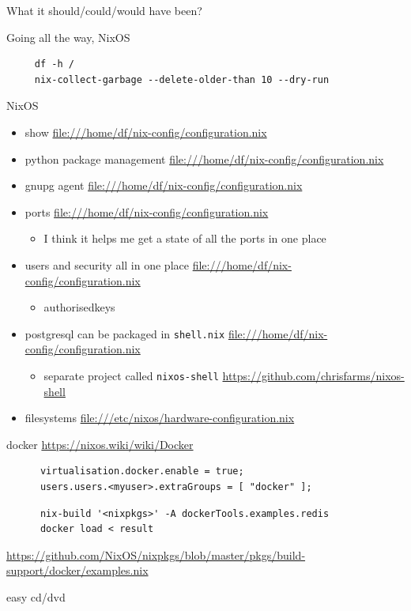 \documentclass[presentation]{beamer}
\begin{document}
\begin{frame}[label={sec:org72632d2},fragile]{What it should/could/would have been?}
\begin{block}{Going all the way, NixOS}
\begin{itemize}
\end{itemize}
\begin{verbatim}
     df -h /
     nix-collect-garbage --delete-older-than 10 --dry-run
\end{verbatim}
\begin{block}{NixOS}
\begin{itemize}
\item show \url{file:///home/df/nix-config/configuration.nix}
\item python package management \url{file:///home/df/nix-config/configuration.nix}
\item gnupg agent \url{file:///home/df/nix-config/configuration.nix}
\item ports \url{file:///home/df/nix-config/configuration.nix}
\begin{itemize}
\item I think it helps me get a state of all the ports in one place
\end{itemize}
\item users and security all in one place
\url{file:///home/df/nix-config/configuration.nix}
\begin{itemize}
\item authorisedkeys
\end{itemize}
\item postgresql can be packaged in \texttt{shell.nix}
\url{file:///home/df/nix-config/configuration.nix}
\begin{itemize}
\item separate project called \texttt{nixos-shell}
\url{https://github.com/chrisfarms/nixos-shell}
\end{itemize}
\item filesystems \url{file:///etc/nixos/hardware-configuration.nix}
\end{itemize}
\end{block}
\begin{block}{docker}
\url{https://nixos.wiki/wiki/Docker}
\begin{verbatim}
      virtualisation.docker.enable = true;
      users.users.<myuser>.extraGroups = [ "docker" ];
\end{verbatim}
\begin{verbatim}
      nix-build '<nixpkgs>' -A dockerTools.examples.redis
      docker load < result
\end{verbatim}
\url{https://github.com/NixOS/nixpkgs/blob/master/pkgs/build-support/docker/examples.nix}
\end{block}
\begin{block}{easy cd/dvd}

\end{block}
\end{block}
\end{frame}
\end{document}
